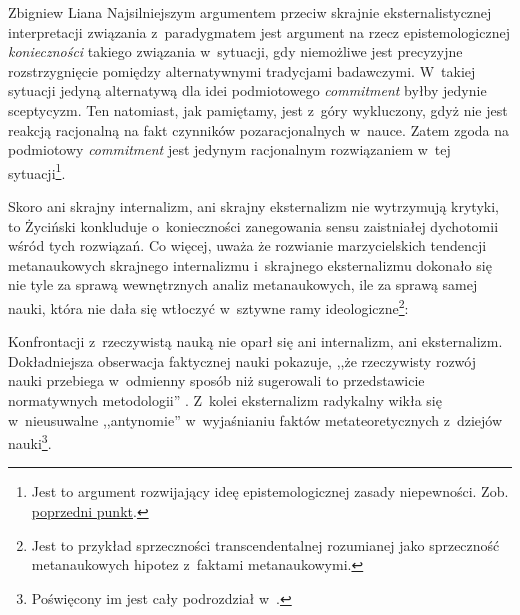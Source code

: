 \begin{artplenv}{Zbigniew Liana}
Najsilniejszym argumentem przeciw skrajnie eksternalistycznej interpretacji związania z~paradygmatem jest argument na
rzecz epistemologicznej \textit{konieczności} takiego związania w~sytuacji, gdy niemożliwe jest precyzyjne
rozstrzygnięcie pomiędzy alternatywnymi tradycjami badawczymi. W~takiej sytuacji jedyną alternatywą dla idei
podmiotowego \textit{commitment} byłby jedynie sceptycyzm. Ten natomiast, jak pamiętamy, jest z~góry wykluczony, gdyż nie
jest reakcją racjonalną na fakt czynników pozaracjonalnych w~nauce. Zatem zgoda na podmiotowy \textit{commitment} jest
jedynym racjonalnym rozwiązaniem w~tej sytuacji\footnote{Jest to argument rozwijający ideę epistemologicznej zasady
niepewności. Zob. \hyperref[lia-sec-4]{poprzedni punkt}.}.

Skoro ani skrajny internalizm, ani skrajny eksternalizm nie wytrzymują krytyki, to Życiński konkluduje o~konieczności
zanegowania sensu zaistniałej dychotomii wśród tych rozwiązań. Co więcej, uważa że rozwianie marzycielskich tendencji
metanaukowych skrajnego internalizmu i~skrajnego eksternalizmu dokonało się nie tyle za sprawą wewnętrznych analiz
metanaukowych, ile za sprawą samej nauki, która nie dała się wtłoczyć w~sztywne ramy ideologiczne\footnote{Jest to
przykład sprzeczności transcendentalnej rozumianej jako sprzeczność metanaukowych hipotez z~faktami metanaukowymi.}:


Konfrontacji z~rzeczywistą nauką nie oparł się ani internalizm, ani eksternalizm. Dokładniejsza obserwacja faktycznej
nauki pokazuje, ,,że rzeczywisty rozwój nauki przebiega w~odmienny sposób niż sugerowali to przedstawicie normatywnych
metodologii''
\parencite[s.~230]{zycinski_elementy_1996}.
Z~kolei eksternalizm radykalny wikła
się w~nieusuwalne ,,antynomie'' w~wyjaśnianiu faktów metateoretycznych z~dziejów nauki\footnote{Poświęcony im jest cały
podrozdział w~\parencite[s.~147–156]{zycinski_elementy_1996}.
}.


\end{artplenv}
